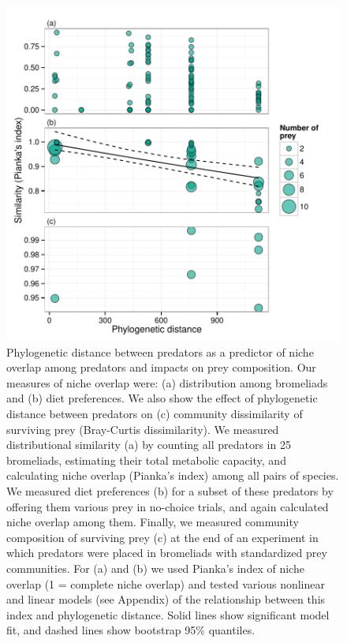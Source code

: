 \begin{figure}[htbp]
\centering
\includegraphics[width=5.5in]{figures/FIG_1.pdf}
\caption[Phylogenetic distance between predators as a
predictor of niche overlap among predators and impacts on prey
composition.]{Phylogenetic distance between predators as a
predictor of niche overlap among predators and impacts on prey
composition. Our measures of niche overlap were: (a) distribution among
bromeliads and (b) diet preferences. We also show the effect of
phylogenetic distance between predators on (c) community dissimilarity
of surviving prey (Bray-Curtis dissimilarity). We measured
distributional similarity (a) by counting all predators in 25
bromeliads, estimating their total metabolic capacity, and calculating
niche overlap (Pianka's index) among all pairs of species. We measured
diet preferences (b) for a subset of these predators by offering them
various prey in no-choice trials, and again calculated niche overlap
among them. Finally, we measured community composition of surviving prey
(c) at the end of an experiment in which predators were placed in
bromeliads with standardized prey communities. For (a) and (b) we used
Pianka's index of niche overlap (1 = complete niche overlap) and tested
various nonlinear and linear models (see Appendix) of the relationship
between this index and phylogenetic distance. Solid lines show
significant model fit, and dashed lines show bootstrap 95\% quantiles.}
\label{fig:phylo_niche_overlap}
\end{figure}


